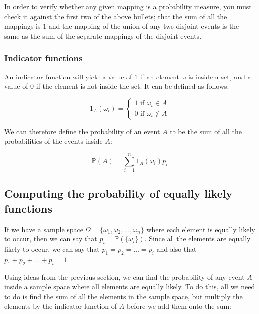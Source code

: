 
In order to verify whether any given mapping is a probability measure, you must
check it against the first two of the above bullets; that the sum of all the
mappings is $1$ and the mapping of the union of any two disjoint events is the
same as the sum of the separate mappings of the disjoint events.

\subsubsection{Indicator functions}

An indicator function will yield a value of $1$ if an element $\omega$ is inside
a set, and a value of $0$ if the element is not inside the set. It can be
defined as follows:

\begin{dmath*}
	1_A(\omega_i) = \begin{cases} 
						1\textrm{ if }\omega_i \in A\\
						0\textrm{ if }\omega_i \not\in A
					\end{cases}
\end{dmath*}

We can therefore define the probability of an event $A$ to be the sum of all the
probabilities of the events inside $A$:

\begin{dmath*}
	\mathbb{P}(A) = \sum\limits_{i=1}^n1_A(\omega_i)p_i
\end{dmath*}


\subsection{Computing the probability of equally likely functions}

If we have a sample space $\Omega = \{ \omega_1, \omega_2, \dots, \omega_n \}$
where each element is equally likely to occur, then we can say that $p_i =
\mathbb{P}(\{\omega_i\})$. Since all the elements are equally likely to occur,
we can say that $p_1 = p_2 = \dots = p_i$ and also that $p_1 + p_2 + \dots + p_i
= 1$.

Using ideas from the previous section, we can find the probability of any event
$A$ inside a sample space where all elements are equally likely. To do this, all
we need to do is find the sum of all the elements in the sample space, but
multiply the elements by the indicator function of $A$ before we add them onto
the sum:

